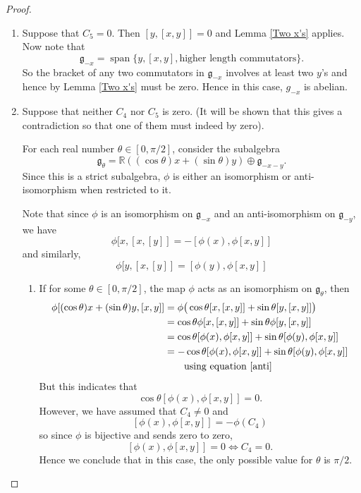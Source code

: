\documentclass[honours]{UNSWthesis}
\newcommand{\R}{\mathbb{R}}
\newcommand{\g}{\mathfrak{g}}
\newcommand{\1}{\mathbf{e}_{1}}
\newcommand{\2}{\mathbf{e}_{3}}
\newcommand{\3}{\mathbf{e}_{3}}
\DeclareMathOperator{\spn}{span}
\begin{document}
\begin{proof}
\begin{enumerate}
\item Suppose that $C_5=0$. Then $[y,[x,y]]=0$ and Lemma \ref{Two x's} applies. Now note that 
\[
\g_{-x} = \spn \{ y, [x,y], \text{higher length commutators}\}.
\]
So the bracket of any two commutators in $\g_{-x}$ involves at least two $y$'s and hence by Lemma \ref{Two x's} must be zero. Hence in this case, $g_{-x}$ is abelian.

\item Suppose that neither $C_4$ nor $C_5$ is zero. (It will be shown that this gives a contradiction so that one of them must indeed by zero). 

For each real number $\theta \in [0,\pi/2]$, consider the subalgebra 
\[
\g_\theta= \R((\cos{\theta})x + (\sin{\theta})y) \oplus \g_{-x-y}.
\]
Since this is a strict subalgebra, $\phi$ is either an isomorphism or anti-isomorphism when restricted to it. 

Note that since $\phi$ is an isomorphism on $\g_{-x}$ and an anti-isomorphism on $\g_{-y}$, we have
\begin{equation}\label{anti}
\phi[x,[x,[y]]= -[\phi(x),\phi[x,y]]
\end{equation}
and similarly,
\begin{equation}\label{iso}
\phi[y,[x,[y]]= [\phi(y),\phi[x,y]]
\end{equation}
\begin{enumerate}
\item If for some $\theta \in [0,\pi/2]$, the map $\phi$ acts as an isomorphism on $\g_{\theta}$, then
\begin{align*}
\phi[(\cos{\theta})x + (\sin{\theta})y,[x,y]] &=
\phi\big( \cos{\theta}[x,[x,y]]+ \sin{\theta}[y,[x,y]] \big) \\
&= \cos{\theta}\phi[x,[x,y]]+ \sin{\theta}\phi[y,[x,y]] \\
&= \cos{\theta}[\phi(x),\phi[x,y]]+ \sin{\theta}[\phi(y),\phi[x,y]] \\
&= -\cos{\theta}[\phi(x),\phi[x,y]]+ \sin{\theta}[\phi(y),\phi[x,y]] \\ 
& \quad \quad  \text{using equation \ref{anti}}
\end{align*}
But this indicates that 
\[
\cos{\theta}[\phi(x),\phi[x,y]]=0.
\]
However, we have assumed that $C_4 \neq 0 $ and 
\[
[\phi(x),\phi[x,y]]= -\phi(C_4)
\]
so since $\phi$ is bijective and sends zero to zero, 
\[
[\phi(x),\phi[x,y]]=0 \iff C_4=0.
\]
Hence we conclude that in this case, the only possible value for $\theta$ is $\pi/2$. 



\end{enumerate}
\end{enumerate}
\end{proof}
\end{document}
